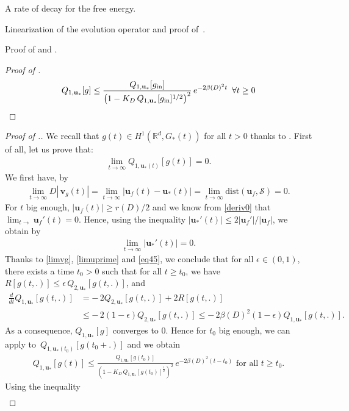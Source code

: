 \documentclass[reqno]{amsart} %
\begin{document}
\begin{section}{A rate of decay for the free energy.}
\begin{section}{Linearization of the evolution operator and proof of~\texorpdfstring{}{thm3}.}
\begin{subsection}{Proof of  \texorpdfstring{}{thme1} and \texorpdfstring{}{thm3}.}
\begin{proof}[Proof of ]
\begin{equation*}
    Q_{1,\mathbf{u}_*}[g] \leq \frac{Q_{1,\mathbf{u}_*}[g_{\mathrm{in}}]}{\left(1 - K_D\, Q_{1,\mathbf{u}_*}[g_{\mathrm{in}}]^{1/2} \right)^2} \, e^{-2\beta(D)^2 t} \,\,\, \forall t \geq 0 \qedhere
\end{equation*}
\end{proof}
   \begin{proof}[Proof of .]
   We recall that $g(t) \in H^1(\mathbb{R}^d,G_{*}(t))$ for all $t > 0$ thanks to .
     First of all, let us prove that: 
   \begin{align*}
       \lim_{t\rightarrow \infty} Q_{1,\mathbf{u}_{*}(t)}[g(t)]=0.
   \end{align*}
 We first have, by 
\begin{align}
\label{limvg}
    \lim_{t\rightarrow \infty}D|\,\mathbf{v}_g(t)|=\lim_{t \rightarrow \infty}\left|\mathbf{u}_{f}(t)-\mathbf{u}_*(t)\right|=\lim_{t\rightarrow \infty}\mathrm{dist}(\mathbf{u}_{f}, \mathcal{S})  =0.
\end{align}
For $t$ big enough, $|\mathbf{u}_{f}(t)| \geq r(D)/2$ and we know from \eqref{deriv0} that $\lim_{t\rightarrow}\mathbf{u}_{f}'(t)=0$. Hence, using the inequality $ |\mathbf{u}_*'(t)| \leq 2{|\mathbf{u}_{f}'|}/{|\mathbf{u}_{f}|}$, we obtain by 
 \begin{align}
 \label{limuprime}
     \lim_{t\rightarrow \infty }|\mathbf{u}_*'(t)| =0.
 \end{align}
 Thanks to \eqref{limvg}, \eqref{limuprime} and \eqref{eq45}, we conclude that
  for all $\epsilon \in  (0,1)$, there exists a time $t_0>0$ such that for all  $t\geq t_0$, we have $R[g(t,.)]\leq \epsilon \, Q_{2,\mathbf{u}_*}[g(t,.)] $, and 
\begin{align*}
     \frac{d}{dt} Q_{1,\mathbf{u}_*}[g(t,.)]&= -\,2 Q_{2,\mathbf{u}_*}[g(t,.)]+2 R[g(t,.)] \\& \leq  -\,2(1-\epsilon )  Q_{2,\mathbf{u}_*}[g(t,.)]
     \leq -\,2\beta(D)^2(1 -\epsilon )Q_{1,\mathbf{u}_*}[g(t,.)].
\end{align*}
As a consequence, $Q_{1,\mathbf{u}_*}[g] $ converges to $0$. Hence for $t_0$ big enough, we can apply  to~$Q_{1,\mathbf{u}_*(t_0)}[g(t_0+.)]$ and we obtain
\begin{align*}
    {Q_{1,\mathbf{u}_*}[g(t)]}\leq\frac{Q_{1,\mathbf{u}_*}[g(t_0)]}{\left(1-K_D \,Q_{1,\mathbf{u}_*}[g{(t_0)}]^{\frac{1}{2}}\right)^2} \,e^{-2\beta(D)^2(t-t_0)} \text{ for all } t\geq t_0.
\end{align*}
   Using the inequality
   \begin{align*}

\end{align*}
\end{proof}
\end{subsection}
\end{section}
\end{section}
\end{document}
